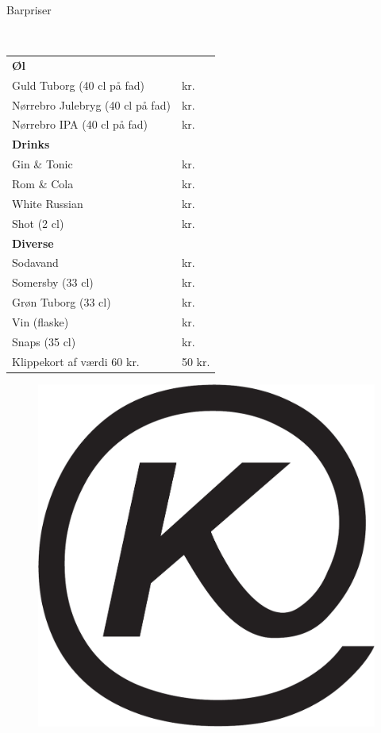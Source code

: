 \begin{flushleft}
\begin{huge}
Barpriser
\end{huge}
\\[.1cm]
\begin{table}[h!]
\begin{tabular}{p{} p{}}
\textbf{Øl} & \\
Guld Tuborg (40 cl på fad) &  kr.\\
Nørrebro Julebryg (40 cl på fad) &  kr.\\
Nørrebro IPA (40 cl på fad) &  kr.\\[2ex]
\textbf{Drinks} & \\
Gin \& Tonic & kr.\\
Rom \& Cola & kr.\\
White Russian & kr.\\
Shot (2 cl) & kr.\\[2ex]
\textbf{Diverse} & \\
Sodavand &  kr.\\
Somersby (33 cl) &  kr. \\
Grøn Tuborg (33 cl) &  kr.\\
Vin (flaske) &  kr.\\
Snaps (35 cl) &  kr.\\
Klippekort af værdi 60 kr. & 50 kr.\\
\end{tabular}
\end{table}
\end{flushleft}
\begin{figure}[h!]
    \begin{center}
    \includegraphics[width=.45\linewidth]{../logo.pdf}
\end{center}
\end{figure}
